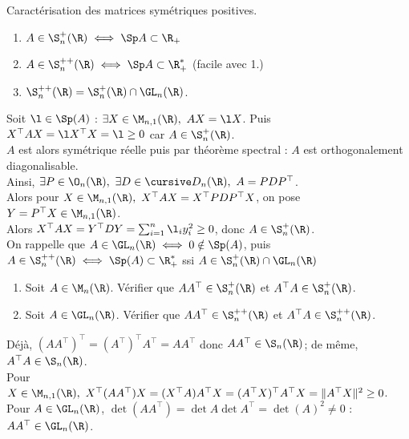 \documentclass[11pt]{article}
\begin{document}
\begin{prop}{Caractérisation des matrices symétriques positives.}{}
    \begin{enumerate}
        \item $A \in \S_n^{+}(\R) \iff \Sp A \subset \R_+$
        \item $A \in \S_n^{++}(\R) \iff \Sp A \subset \R_+^*$ (facile avec 1.)
        \item $\S_n^{++}(\R)=\S_n^+(\R)\cap\GL_n(\R)$.
    \end{enumerate}
    \tcblower
     Soit $\l\in\Sp(A)$ : $\exists X\in\M_{n,1}(\R), ~ AX=\l X$. Puis $X^\top AX = \l X^\top X = \l \geq 0$ car $A\in\S_n^+(\R)$.\\
     $A$ est alors symétrique réelle puis par théorème spectral : $A$ est orthogonalement diagonalisable.\\
    Ainsi, $\exists P \in \O_n(\R), ~ \exists D \in \D_n(\R), ~ A=PDP^\top$.\\
    Alors pour $X\in \M_{n,1}(\R), ~ X^\top AX = X^\top PDP^\top X$, on pose $Y=P^{\top}X\in\M_{n,1}(\R)$.\\
    Alors $X^\top AX = Y^\top DY = \sum_{i=1}^n\l_i y_i^2 \geq 0$, donc $A\in\S_n^+(\R)$.\\
     On rappelle que $A\in\GL_n(\R) \iff 0 \notin \Sp(A)$, puis $A\in\S_n^{++}(\R) \iff \Sp(A) \subset \R_+^*$ ssi $A\in\S_n^+(\R)\cap \GL_n(\R)$
\end{prop}

\begin{exercice}{}{}
    \begin{enumerate}
        \item Soit $A\in\M_n(\R)$. Vérifier que $AA^\top\in\S_n^+(\R)$ et $A^\top A \in \S_n^+(\R)$.
        \item Soit $A\in\GL_n(\R)$. Vérifier que $AA^\top\in\S_n^{++}(\R)$ et $A^\top A\in\S_n^{++}(\R)$.
    \end{enumerate}
    \tcblower
     Déjà, $(AA^\top)^\top = (A^\top)^\top A^\top = AA^\top$ donc $AA^\top \in \S_n(\R)$; de même, $A^\top A \in \S_n(\R)$.\\
    Pour $X\in\M_{n,1}(\R), ~ X^\top(AA^\top)X = (X^\top A)A^\top X = (A^\top X)^\top A^\top X = \|A^\top X\|^2 \geq 0$.\\
     Pour $A\in\GL_n(\R)$, $\det(AA^\top)=\det A \det A^\top = \det(A)^2 \neq 0$ : $AA^\top \in \GL_n(\R)$.
\end{exercice}
\end{document}
